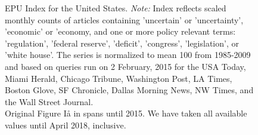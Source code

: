 \documentclass[a4paper,12pt,oneside,pointednumbers,bibtotoc,bigheadings,liststotoc]{scrbook}
\begin{document}
\begin{figure}[h]
   \centering
   \setlength\fboxsep{0pt}
   \setlength\fboxrule{0pt}
      \caption[EPU Index for the United States.]{EPU Index for the United States.
      \textit{Note:} Index reflects scaled monthly counts of articles containing 'uncertain' or 'uncertainty', 'economic' or 'economy, and one or more policy relevant terms: 'regulation', 'federal reserve', 'deficit', 'congress', 'legislation', or 'white house'. The series is normalized to mean 100 from 1985-2009 and based on queries run on 2 February, 2015 for the USA Today, Miami Herald, Chicago Tribune, Washington Post, LA Times, Boston Glove, SF Chronicle, Dallas Morning News, NW Times, and the Wall Street Journal.\\
      Original Figure Iå in \citet{bakeretal:15} spans until 2015. We have taken all available values until April 2018, inclusive.}   \label{fig:epuindex}
\end{figure}
\end{document}
